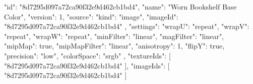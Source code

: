 {
  "id": "8d7295d097a72ca90f32e9d462cb1bd4",
  "name": "Worn Bookshelf Base Color",
  "version": 1,
  "source": {
    "kind": "image",
    "imageId": "8d7295d097a72ca90f32e9d462cb1bd4"
  },
  "settings": {
    "wrapU": "repeat",
    "wrapV": "repeat",
    "wrapW": "repeat",
    "minFilter": "linear",
    "magFilter": "linear",
    "mipMap": true,
    "mipMapFilter": "linear",
    "anisotropy": 1,
    "flipY": true,
    "precision": "low",
    "colorSpace": "srgb"
  },
  "textureIds": [
    "8d7295d097a72ca90f32e9d462cb1bd4"
  ],
  "imageIds": [
    "8d7295d097a72ca90f32e9d462cb1bd4"
  ]
}
